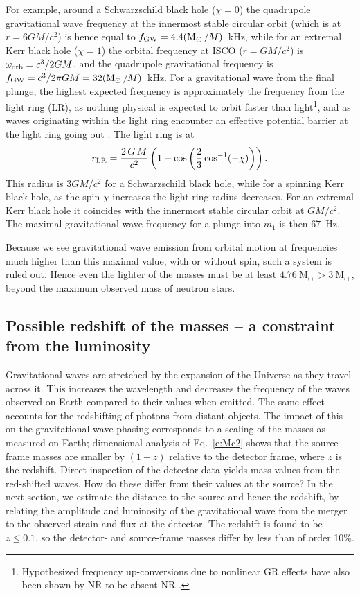 \documentclass{andp2012}%
\def\w{\omega}
\newcommand{\refeqn}[1]{Eq.\ \ref{#1}}
\newcommand{\caveatformat}[1]{\subsection{#1}}
\def\orb{_{\rm orb}}
\def\BH{black hole }		\def\BHs{black holes }			\def\BHns{black hole}		\def\BHsns{black holes}		\def\GW{gravitational wave }		\def\GWs{gravitational waves }				\def\GWns{gravitational wave}		\def\GWsns{gravitational waves}		\def\LR{light ring }		\def\ISCO{innermost stable circular orbit }		\def\NS{neutron star }		\def\NSs{neutron stars }		\def\GR{general relativity }
\newcommand{\Msun}{\ensuremath{\mathrm{M}_\odot\,}}
\begin{document}
For example, around a Schwarzschild \BH ($\chi=0$) the quadrupole
\GW frequency at the \ISCO
(which is at $r = 6 GM/c^2$) is hence equal to
$f_{\rm GW} = 4.4 ( \Msun / M ) $~kHz,
while for an extremal Kerr \BH ($\chi=1$)
the orbital frequency at
ISCO ($r = GM/c^2$)
is $\w\orb = c^3/2GM$,
and the quadrupole gravitational frequency is 
$f_{\rm GW} = c^3/2\pi GM = 32 ( \Msun / M )$~kHz.
For a \GW from the final plunge,
the highest expected frequency is approximately
the frequency from the light ring (LR),
as nothing physical is expected
to orbit faster than light\footnote{Hypothesized
frequency up-conversions
due to nonlinear GR effects
have also been shown by NR
to be absent NR
\cite{Pretorius:2005gq, Buonanno:2006ui, Boyle:2007ft}.},
and as waves originating within the \LR
encounter an effective potential barrier
at the \LR going out\cite{
Davis:1971gg, Press:1971wr, Davis:1972ud, Buonanno:2000ef, Cardoso:2016rao}
.
The \LR is at
\begin{equation}
r_{\rm LR}= \frac{2\,G\,M}{c^2} \left(1 + \cos \left(\frac{2}{3}
\cos^{-1}(-\chi)\right)\right).
\label{eq:LR}
\end{equation}
This radius is $3GM/c^2$ for a Schwarzschild \BHns, while for a spinning Kerr \BHns,
as the spin $\chi$ increases the \LR radius decreases. For an extremal Kerr \BH it
coincides with the \ISCO at $GM/c^2$.
The maximal \GW frequency for a plunge into $m_1$ is then $67$~Hz.

Because we see \GW emission from orbital motion at frequencies much higher
than this maximal value, with or without spin, such a system is ruled out.
Hence even the lighter of the masses must be at least $4.76 ~\Msun\! > 3~\Msun\!$,
beyond the maximum observed mass of neutron stars.



\caveatformat{Possible redshift of the masses -- a constraint from the luminosity}
\label{Sec:just:distance}
Gravitational waves are stretched by the expansion of the Universe as they travel across it.
This increases the wavelength and decreases the frequency of the waves observed on Earth
compared to their values when emitted.  The same effect accounts for the redshifting of photons from distant objects.
The impact of this on the gravitational wave phasing corresponds to a scaling of the masses as measured on Earth;
dimensional analysis of \refeqn{e:Mc2} shows that
the source frame masses are smaller by $(1+z)$ relative to the detector frame,
where $z$ is the redshift.
Direct inspection of the detector data yields mass values from the red-shifted waves.
How do these differ from their values at the source?
In the next section, we estimate the distance to the source and hence the redshift, by
relating the amplitude and luminosity of the \GW from the merger
to the observed strain and flux  at the detector.
The redshift is found to be $z\le 0.1$, so the detector- and source-frame masses differ by less than 
of order 10$\%$.
\end{document}
